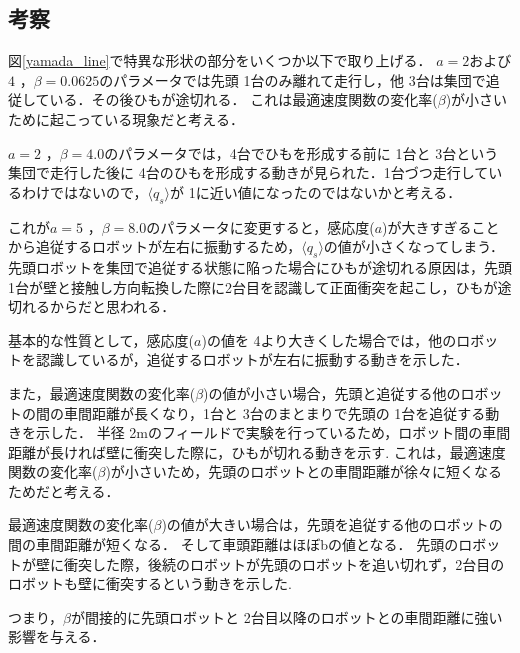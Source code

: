 \documentclass[twocolumn]{jarticle} %
\begin{document}
\subsection{考察}
図\ref{yamada_line}で特異な形状の部分をいくつか以下で取り上げる．
$a=2$および $ 4 $ ，$\beta=0.0625$のパラメータでは先頭 1台のみ離れて走行し，他 3台は集団で追従している．その後ひもが途切れる．
これは最適速度関数の変化率($\beta$)が小さいために起こっている現象だと考える．

$a=2$ ，$\beta=4.0$のパラメータでは，4台でひもを形成する前に 1台と 3台という集団で走行した後に 4台のひもを形成する動きが見られた．1台づつ走行しているわけではないので，$\langle q_s \rangle$が 1に近い値になったのではないかと考える．

これが$a=5$ ，$\beta=8.0$のパラメータに変更すると，感応度($a$)が大きすぎることから追従するロボットが左右に振動するため，$\langle q_s \rangle$の値が小さくなってしまう．
先頭ロボットを集団で追従する状態に陥った場合にひもが途切れる原因は，先頭 1台が壁と接触し方向転換した際に2台目を認識して正面衝突を起こし，ひもが途切れるからだと思われる．

基本的な性質として，感応度($a$)の値を 4より大きくした場合では，他のロボットを認識しているが，追従するロボットが左右に振動する動きを示した．

また，最適速度関数の変化率($\beta$)の値が小さい場合，先頭と追従する他のロボットの間の車間距離が長くなり，1台と 3台のまとまりで先頭の 1台を追従する動きを示した．
半径 2mのフィールドで実験を行っているため，ロボット間の車間距離が長ければ壁に衝突した際に，ひもが切れる動きを示す.
これは，最適速度関数の変化率($\beta$)が小さいため，先頭のロボットとの車間距離が徐々に短くなるためだと考える．

最適速度関数の変化率($\beta$)の値が大きい場合は，先頭を追従する他のロボットの間の車間距離が短くなる．
そして車頭距離はほぼbの値となる．
先頭のロボットが壁に衝突した際，後続のロボットが先頭のロボットを追い切れず，2台目のロボットも壁に衝突するという動きを示した.

つまり，$\beta$が間接的に先頭ロボットと 2台目以降のロボットとの車間距離に強い影響を与える．
\end{document}
